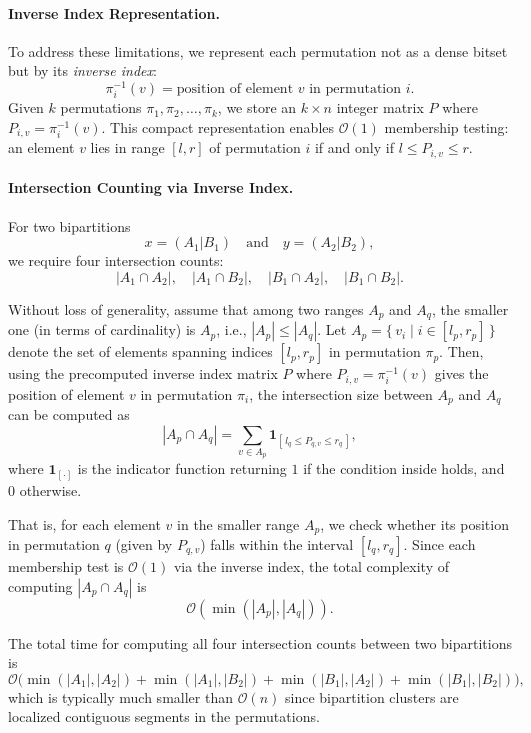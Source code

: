 \documentclass[11pt]{article}
\begin{document}
\paragraph{Inverse Index Representation.}
To address these limitations, we represent each permutation not as a dense
bitset but by its \emph{inverse index}:
\[
\pi_i^{-1}(v) = \text{position of element } v \text{ in permutation } i.
\]
Given $k$ permutations $\pi_1, \pi_2, \dots, \pi_k$, we store an
$k \times n$ integer matrix $P$ where $P_{i,v} = \pi_i^{-1}(v)$.
This compact representation enables $\mathcal{O}(1)$ membership testing:
an element $v$ lies in range $[l,r]$ of permutation $i$ if and only if
$l \le P_{i,v} \le r$.

\paragraph{Intersection Counting via Inverse Index.}
For two bipartitions
\[
x = (A_1|B_1) \quad \text{and} \quad y = (A_2|B_2),
\]
we require four intersection counts:
\[
|A_1 \cap A_2|,\quad |A_1 \cap B_2|,\quad |B_1 \cap A_2|,\quad |B_1 \cap B_2|.
\]


Without loss of generality, assume that among two ranges $A_p$ and $A_q$,
the smaller one (in terms of cardinality) is $A_p$, i.e.,
$|A_p| \le |A_q|$.
Let $A_p = \{\,v_i \mid i \in [l_p, r_p]\,\}$ denote the set of elements
spanning indices $[l_p, r_p]$ in permutation $\pi_p$.
Then, using the precomputed inverse index matrix $P$ where
$P_{i,v} = \pi_i^{-1}(v)$ gives the position of element $v$ in
permutation $\pi_i$, the intersection size between $A_p$ and $A_q$ can be
computed as
\begin{equation}
|A_p \cap A_q| = 
\sum_{v \in A_p} 
\mathbf{1}_{[\,l_q \le P_{q,v} \le r_q\,]},
\label{eq:invindex_intersect}
\end{equation}
where $\mathbf{1}_{[\cdot]}$ is the indicator function returning $1$
if the condition inside holds, and $0$ otherwise.

That is, for each element $v$ in the smaller range $A_p$, we check whether
its position in permutation $q$ (given by $P_{q,v}$) falls within the
interval $[l_q, r_q]$.
Since each membership test is $\mathcal{O}(1)$ via the inverse index,
the total complexity of computing $|A_p \cap A_q|$ is
\[
\mathcal{O}(\min(|A_p|, |A_q|)).
\]



The total time for computing all four intersection counts between two
bipartitions is
\[
\mathcal{O}\big(\min(|A_1|,|A_2|) + \min(|A_1|,|B_2|) +
\min(|B_1|,|A_2|) + \min(|B_1|,|B_2|)\big),
\]
which is typically much smaller than $\mathcal{O}(n)$ since bipartition
clusters are localized contiguous segments in the permutations.
\end{document}
